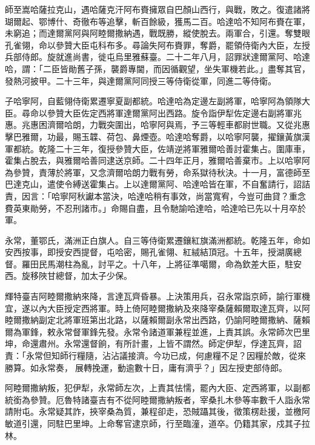 \begin{pinyinscope}
師至嵩哈薩拉克山，遇哈薩克汗阿布賚擁眾自巴顏山西行，與戰，敗之。復遣諸將瑚爾起、鄂博什、奇徹布等追擊，斬百餘級，獲馬二百。哈達哈不知阿布賚在軍，未窮追；而達爾黨阿與阿睦爾撒納遇，戰既勝，縱使脫去。兩軍合，引還。奪雙眼孔雀翎，命以參贊大臣屯科布多。尋論失阿布賚罪，奪爵，罷領侍衛內大臣，左授兵部侍郎。旋就進尚書，徙屯烏里雅蘇臺。二十二年八月，詔罪狀達爾黨阿、哈達哈，謂：「二臣皆勛舊子孫，襲爵專閫，而因循觀望，坐失軍機若此。」盡奪其官，發熱河披甲。二十三年，與達爾黨阿同授三等侍衛從軍，同進二等侍衛。

子哈寧阿，自藍翎侍衛累遷寧夏副都統。哈達哈為定邊左副將軍，哈寧阿為領隊大臣。尋命以參贊大臣佐定西將軍達爾黨阿出西路。旋令詣伊犁佐定邊右副將軍兆惠。兆惠困濟爾哈朗，力戰突圍出，哈寧阿與焉，予三等輕車都尉世職。又從兆惠擊巴雅爾，功最，賜玉韘、荷包、鼻煙壺。哈達哈奪爵，以哈寧阿襲，擢鑲黃旗漢軍都統。乾隆二十三年，復授參贊大臣，佐靖逆將軍雅爾哈善討霍集占。圍庫車，霍集占脫去，與雅爾哈善同逮送京師。二十四年正月，雅爾哈善棄市。上以哈寧阿為參贊，責薄於將軍，又念濟爾哈朗力戰有勞，命系獄待秋決。十一月，富德師至巴達克山，遣使令縛送霍集占。上以達爾黨阿、哈達哈皆在軍，不自奮請行，詔詰責，因言：「哈寧阿秋讞本當決，哈達哈稍有事效，尚當寬宥，今豈可曲貸？重念費英東勛勞，不忍刑諸市。」命賜自盡，且令馳諭哈達哈，哈達哈已先以十月卒於軍。

永常，董鄂氏，滿洲正白旗人。自三等侍衛累遷鑲紅旗滿洲都統。乾隆五年，命如安西按事，即授安西提督，屯哈密，賜孔雀翎、紅絨結頂冠。十五年，授湖廣總督。羅田民馬潮柱為亂，討平之。十八年，上將征準噶爾，命為欽差大臣，駐安西。旋移陜甘總督，加太子少保。

輝特臺吉阿睦爾撒納來降，言達瓦齊昏暴。上決策用兵，召永常詣京師，諭行軍機宜，遂以內大臣授定西將軍。時上倚阿睦爾撒納及來降宰桑薩賴爾取達瓦齊，以阿睦爾撒納副定北將軍班第出北路，以薩賴爾副永常出西路，仍諭阿睦爾撒納、薩賴爾為軍鋒，敕永常督軍鋒先發。永常令諸道軍兼程並進，上責其誤。永常師次巴里坤，命還肅州。永常還督餉，有所計畫，上皆不謂然。師定伊犁，俘達瓦齊，詔責：「永常但知師行糧隨，沾沾議接濟。今功已成，何慮糧不足？因糧於敵，從來勝算。如永常奏，展轉挽運，動逾數十日，庸有濟乎？」因左授吏部侍郎。

阿睦爾撒納叛，犯伊犁，永常師左次，上責其怯懦，罷內大臣、定西將軍，以副都統銜為參贊。厄魯特諸臺吉有不從阿睦爾撒納叛者，宰桑扎木參等率數千人詣永常請附屯。永常疑其詐，挾宰桑為質，兼程卻走，恐賊躡其後，徵策楞赴援，並檄阿敏道引還，同駐巴里坤。上命奪官逮京師，行至臨潼，道卒。仍籍其家，戍其子拉林。


\end{pinyinscope}
